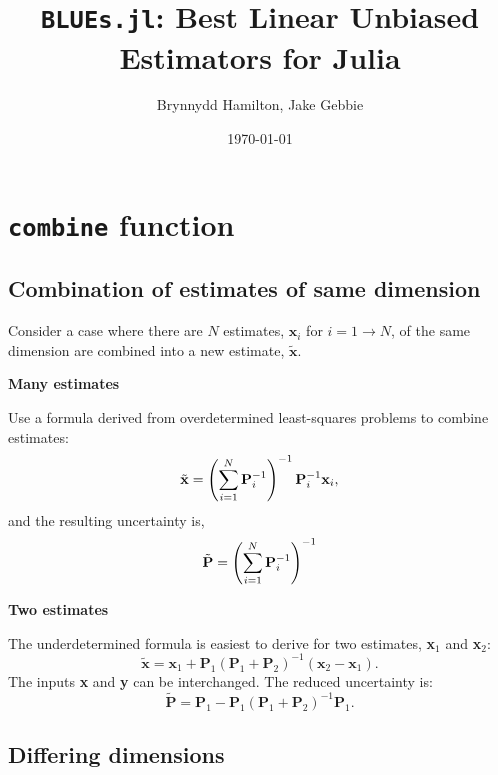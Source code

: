 \documentclass{article}
\title{\texttt{BLUEs.jl}: Best Linear Unbiased Estimators for Julia}
\author{Brynnydd Hamilton, Jake Gebbie}
\date{\today}
\begin{document}
\maketitle

\section{\texttt{combine} function}

\subsection{Combination of estimates of same dimension}
\label{sec:basic-form}

Consider a case where there are $N$ estimates, $\mathbf{x}_i$ for
$i = 1 \rightarrow N$, of the same dimension are combined into a new estimate,
$\tilde{\mathbf{x}}$.

\textbf{{Many estimates}}

Use a formula derived from overdetermined least-squares problems to combine estimates:
\begin{equation}
\label{eq:18}
\tilde{\mathbf{x}} = \left(\sum_{i=1}^N {\bf P}_i^{-1}\right)^{-1} {\bf P}_i^{-1} {\bf x}_i,
\end{equation}
and the resulting uncertainty is,
\begin{equation}
\label{eq:19}
\tilde{{\bf P}} = \left(\sum_{i=1}^N{\bf P}_i^{-1}\right)^{-1}
\end{equation}


\textbf{{Two estimates}}

The underdetermined formula is easiest to derive for two estimates, \textbf{x}$_1$ and \textbf{x}$_2$:
\begin{equation}
\label{eq:15}
\tilde{\mathbf{x}} = \mathbf{x}_{1} + \mathbf{P}_1 (\mathbf{P}_1 + \mathbf{P}_2 )^{-1} (\mathbf{x}_2 - \mathbf{x}_1) .
\end{equation}
The inputs \textbf{x} and \textbf{y} can be interchanged. The reduced uncertainty is:
\begin{equation}
\label{eq:16}
\tilde{\mathbf{P}} = \mathbf{P}_1 - \mathbf{P}_1 (\mathbf{P}_1 + \mathbf{P}_2 )^{-1} \mathbf{P}_1.
\end{equation}

\subsection{Differing dimensions}
\label{sec:differing-dimensions}
\end{document}
